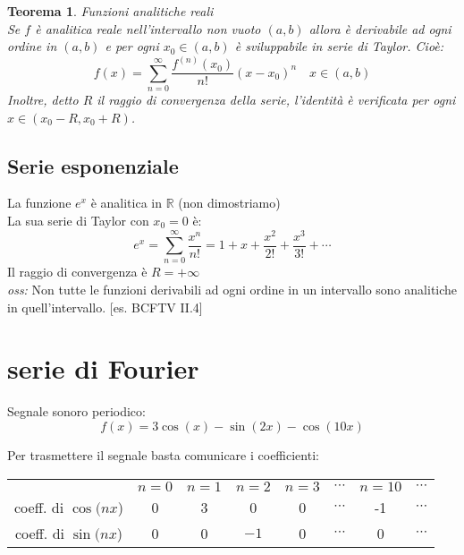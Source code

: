 \documentclass{scrreprt}
\newtheorem{teorema}{Teorema}
\newenvironment{thm}{\begin{mdframed}[backgroundcolor=Ivory2]\begin{teorema}}{\end{teorema}\end{mdframed}}
\begin{document}
\begin{thm}
	\emph{Funzioni analitiche reali}\\
	Se $f$ è analitica reale nell'intervallo non vuoto $(a,b)$ allora è derivabile ad ogni ordine in $(a,b)$ e per ogni $x_0\in (a,b)$ è sviluppabile in serie di Taylor. Cioè:
	\begin{equation}
		f(x) = \sum_{n=0}^\infty \frac{f^{(n)}(x_0)}{n!} \left(x-x_0\right)^n \quad x\in (a,b)
	\end{equation}
	Inoltre, detto $R$ il raggio di convergenza della serie, l'identità è verificata per ogni $x\in (x_0-R,x_0+R)$.
\end{thm}

\subsection*{Serie esponenziale}
La funzione $e^x$ è analitica in $\mathbb{R}$ (non dimostriamo)\\
La sua serie di Taylor con $x_0=0$ è:
\begin{equation}
	e^x = \sum_{n=0}^\infty \frac{x^n}{n!} = 1 + x + \frac{x^2}{2!} + \frac{x^3}{3!} + \cdots
\end{equation}
Il raggio di convergenza è $R=+\infty$\\


\emph{oss:} Non tutte le funzioni derivabili ad ogni ordine in un intervallo sono analitiche in quell'intervallo. [es. BCFTV II.4]

\newpage
\section{serie di Fourier}
Segnale sonoro periodico:
\begin{equation}
	f(x)=3\cos(x)-\sin(2x)-\cos(10x)
\end{equation}

\begin{center}
\end{center}

Per trasmettere il segnale basta comunicare i coefficienti:\\
\begin{center}
	\begin{tabular}{ c c c c c c c c}
	   & $n=0$ & $n=1$ & $n=2$ & $n=3$ & $\cdots$ & $n=10$ & $\cdots$	\\ 
	 coeff. di $\cos(nx$) & 0 & 3 & 0 & 0 & $\cdots$ & -1 & $\cdots$	\\  
	 coeff. di $\sin(nx$) & 0 & 0 & $-1$ & 0 & $\cdots$ & 0 & $\cdots$
	\end{tabular}
\end{center}
\end{document}
